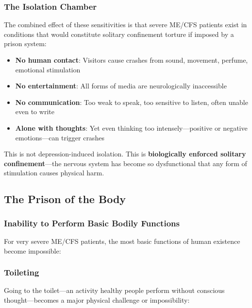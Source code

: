 \subsubsection{The Isolation Chamber}
\label{subsec:isolation}

The combined effect of these sensitivities is that severe ME/CFS patients exist in conditions that would constitute solitary confinement torture if imposed by a prison system:

\begin{itemize}
    \item \textbf{No human contact}: Visitors cause crashes from sound, movement, perfume, emotional stimulation
    \item \textbf{No entertainment}: All forms of media are neurologically inaccessible
    \item \textbf{No communication}: Too weak to speak, too sensitive to listen, often unable even to write
    \item \textbf{Alone with thoughts}: Yet even thinking too intensely---positive or negative emotions---can trigger crashes
\end{itemize}

This is not depression-induced isolation. This is \textbf{biologically enforced solitary confinement}---the nervous system has become so dysfunctional that any form of stimulation causes physical harm.

\subsection{The Prison of the Body}
\label{sec:body-prison}

\subsubsection{Inability to Perform Basic Bodily Functions}
\label{subsec:basic-functions}

For very severe ME/CFS patients, the most basic functions of human existence become impossible:

\subsubsection{Toileting}

Going to the toilet---an activity healthy people perform without conscious thought---becomes a major physical challenge or impossibility:

